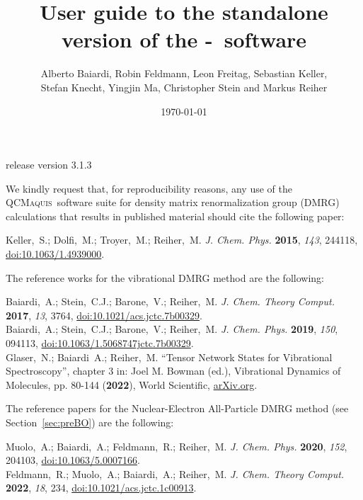 \documentclass[bibliography=totoc,12pt,a4paper]{scrartcl}
\title{User guide to the standalone version of the \scine-\qcm\ software}
\author{Alberto Baiardi, Robin Feldmann, Leon Freitag, Sebastian Keller, \\ Stefan Knecht, Yingjin Ma, Christopher Stein and Markus Reiher}
\date{\today}
\newcommand{\relv}{release version 3.1.3}
\newcommand{\qcm}{\textsc{QCMaquis}}
\begin{document}


\maketitle
\thispagestyle{empty}
\begin{center}
\end{center}
\vspace{-1.85cm}
\centerline{\large{\relv}}

\vspace{2cm}

\noindent We kindly request that, for reproducibility reasons, any use of the \qcm\ software suite for density matrix renormalization group (DMRG) calculations that results in published material should cite the following paper:

\begin{framed}
\noindent Keller,~S.; Dolfi,~M.; Troyer,~M.; Reiher,~M. \emph{J. Chem. Phys.}
  \textbf{2015}, \emph{143}, 244118, \href{https://doi.org/10.1063/1.4939000}{doi:10.1063/1.4939000}.
\end{framed}

The reference works for the vibrational DMRG method are the following:

\begin{framed}
  \noindent Baiardi,~A.; Stein,~C.J.; Barone,~V.; Reiher,~M. \emph{J. Chem. Theory Comput.}
  \textbf{2017}, \emph{13}, 3764, \href{https://doi.org/10.1021/acs.jctc.7b00329}{doi:10.1021/acs.jctc.7b00329}. \\
  \noindent Baiardi,~A.; Stein,~C.J.; Barone,~V.; Reiher,~M. \emph{J. Chem. Phys.}
  \textbf{2019}, \emph{150}, 094113, \href{https://doi.org/10.1063/1.5068747jctc.7b00329}{doi:10.1063/1.5068747jctc.7b00329}. \\
  \noindent Glaser,~N.; Baiardi~A.; Reiher,~M. ``Tensor Network States for Vibrational Spectroscopy'', chapter 3 in: Joel M. Bowman (ed.), Vibrational Dynamics of Molecules, pp. 80-144 (\textbf{2022}), World Scientific, \href{https://arxiv.org/abs/2109.08961}{arXiv.org}. \\
\end{framed}

The reference papers for the Nuclear-Electron All-Particle DMRG method (see Section~\ref{sec:preBO}) are the following:

\begin{framed}
  \noindent Muolo,~A.; Baiardi,~A.; Feldmann,~R.; Reiher,~M. \emph{J. Chem. Phys.} \textbf{2020}, \emph{152}, 204103, \href{https://doi.org/10.1063/5.0007166}{doi:10.1063/5.0007166}. \\
  \noindent Feldmann,~R.; Muolo,~A.; Baiardi,~A.; Reiher,~M. \emph{J. Chem. Theory Comput.} \textbf{2022}, \emph{18}, 234, \href{https://doi.org/10.1021/acs.jctc.1c00913}{doi:10.1021/acs.jctc.1c00913}. 
\end{framed}
\end{document}
